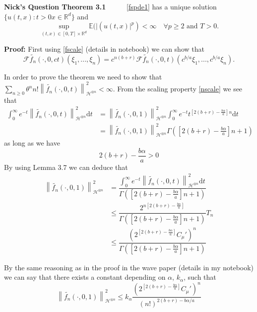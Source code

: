 \documentclass[a4paper,11pt]{article}
\numberwithin{equation}{section}
\theoremstyle{plain}
\theoremstyle{definition}
\newcommand{\ud}{\ensuremath{\mathrm{d} }}
\newcommand{\Norm}[1]{\left\|  #1   \right\|}
\newcommand{\R}{\mathbb{R}}
\newcounter{NQ}
\newenvironment{NickQuestion}[1][] %
{\refstepcounter{NQ}
	\begin{mdframed}[backgroundcolor=lightgray]\textbf{Nick's Question \theNQ \: #1~~}~~~\noindent}%
	{\end{mdframed}}
\numberwithin{NQ}{section}
\numberwithin{LQ}{section}
\numberwithin{ZQ}{section}
\begin{document}
	\begin{NickQuestion}[Theorem 3.1]
		\ref{fspde1} has a unique solution $\{ u(t,x) : t>0 x \in \R^d \}$ and
		\[
		\sup_{(t,x) \in [0,T]\times \R^d} \mathbb{E} (|(u(t,x)|^p) < \infty \quad \forall p \ge 2 \text{ and } T>0.
		\]

		\textbf{Proof:}
		First using \ref{fscale} (details in notebook) we can show that
		\begin{equation}
		\mathcal{F}\tilde{f_n}(\cdot,0,ct)(\xi_1,..., \xi_n) = c^{n(b+r)}\mathcal{F}\tilde{f_n}(\cdot,0,t)(c^{b/a}\xi_1,...,c^{b/a}\xi_n).
		\end{equation}

		In order to prove the theorem we need to show that $\sum_{n \ge 0} \theta^n n! \Norm{ \tilde{f_n}(\cdot,0,t) }_{ \mathcal{H}^{\otimes n} }^2 < \infty.$ From the scaling property \ref{nscale} we see that
		\begin{align*}
		\int_0^\infty e^{-t} \Norm{ \tilde{f_n}(\cdot,0,t) }_{ \mathcal{H}^{\otimes n} }^2 \ud t & = \Norm{ \tilde{f_n}(\cdot,0,1) }_{ \mathcal{H}^{\otimes n} }^2 \int_0^\infty e^{-t} t^{ \left[ 2(b+r)-\frac{b \alpha}{a} \right] n } \ud t
		\\&= \Norm{ \tilde{f_n}(\cdot,0,1) }_{ \mathcal{H}^{\otimes n} }^2 \Gamma\left( \left[ 2(b+r)- \frac{b \alpha}{a} \right] n +1 \right)
		\end{align*}
		as long as we have
		\begin{equation} \label{alpha3}
		2(b+r)-\frac{b\alpha}{a} >0
		\end{equation}
		By using Lemma 3.7 we can deduce that
		\begin{align*}
		\Norm{ \tilde{f_n}(\cdot,0,1) }_{ \mathcal{H}^{\otimes n} }^2 &= \dfrac{ \int_0^\infty e^{-t} \Norm{ \tilde{f_n}(\cdot,0,t) }_{ \mathcal{H}^{\otimes n} }^2 \ud t }{ \Gamma\left( \left[ 2(b+r)- \frac{b \alpha}{a} \right] n +1 \right) }
		\\ &\le \dfrac{ 2^{n \left[ 2(b+r)- \frac{b \alpha}{a} \right]} }{ \Gamma\left( \left[ 2(b+r)- \frac{b \alpha}{a} \right] n +1 \right) } T_n
		\\& \le \dfrac{ \left(2^{ \left[ 2(b+r)- \frac{b \alpha}{a} \right]}C_\mu' \right)^n }{ \Gamma\left( \left[ 2(b+r)- \frac{b \alpha}{a} \right] n +1 \right) }
		\end{align*}

		By the same reasoning as in the proof in the wave paper (details in my notebook) we can say that there exists a constant depending on $\alpha$, $k_\alpha$, such that
		\[
		\Norm{ \tilde{f_n}(\cdot,0,1) }_{ \mathcal{H}^{\otimes n} }^2 \le k_{\alpha} \dfrac{ \left(2^{ \left[ 2(b+r)- \frac{b \alpha}{a} \right]}C_\mu' \right)^n }{ (n!)^{ 2(b+r) - b\alpha/a } }
		\]


\end{NickQuestion}
\end{document}
